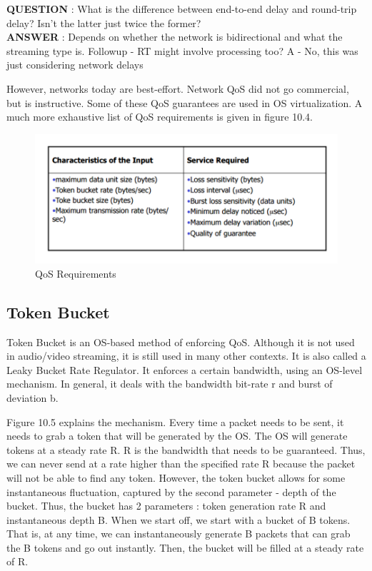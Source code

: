 \documentclass[twoside]{article}
\begin{document}
\textbf{QUESTION} : What is the difference between end-to-end delay and round-trip delay? Isn't the latter just twice the former? \\
\textbf{ANSWER} : Depends on whether the network is bidirectional and what the streaming type is. Followup - RT might involve processing too? A - No, this was just considering network delays


However, networks today are best-effort. Network QoS did not go commercial, but is instructive. Some of these QoS guarantees are used in OS virtualization.
A much more exhaustive list of QoS requirements is given in figure 10.4.

\begin{figure}[t]
\includegraphics[scale=0.5]{qos.png}
\centering
\caption{QoS Requirements}
\end{figure}


\subsection{Token Bucket}
Token Bucket is an OS-based method of enforcing QoS. Although it is not used in audio/video streaming, it is still used in many other contexts. It is also called a Leaky Bucket Rate Regulator. It enforces a certain bandwidth, using an OS-level mechanism. In general, it deals with the bandwidth bit-rate r and burst of deviation b.

Figure 10.5 explains the mechanism. Every time a packet needs to be sent, it needs to grab a token that will be generated by the OS. The OS will generate tokens at a steady rate R. R is the bandwidth that needs to be guaranteed. Thus, we can never send at a rate higher than the specified rate R because the packet will not be able to find any token. However, the token bucket allows for some instantaneous fluctuation, captured by the second parameter - depth of the bucket. Thus, the bucket has 2 parameters : token generation rate R and instantaneous depth B. When we start off, we start with a bucket of B tokens. That is, at any time, we can instantaneously generate B packets that can grab the B tokens and go out instantly. Then, the bucket will be filled at a steady rate of R. 
\end{document}
